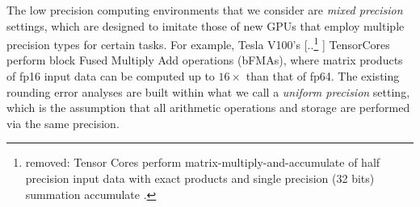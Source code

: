 \documentclass[review,onefignum,onetabnum]{siamart190516}
\providecommand{\DIFadd}[1]{{\protect\color{blue} \sf #1}} %
\providecommand{\DIFdel}[1]{{\protect\color{red} [..\footnote{removed: #1} ]}} %
\providecommand{\DIFaddbegin}{} %
\providecommand{\DIFaddend}{} %
\providecommand{\DIFdelbegin}{} %
\providecommand{\DIFdelend}{} %
\begin{document}
The low precision computing environments that we consider are \emph{mixed precision} settings, which are designed to imitate those of new GPUs that employ multiple precision types for certain tasks. 
For example, Tesla V100's \DIFdelbegin \DIFdel{Tensor Cores perform matrix-multiply-and-accumulate of half precision input data with exact products and single precision (32 bits) summation accumulate \cite{nvdia}.
}\DIFdelend \DIFaddbegin \DIFadd{TensorCores perform block Fused Multiply Add operations (bFMAs), where matrix products of fp16 input data can be computed up to $16\times$ than that of fp64.
}\DIFaddend The existing rounding error analyses are built within what we call a \emph{uniform precision} setting, which is the assumption that all arithmetic operations and storage are performed via the same precision.
\end{document}
